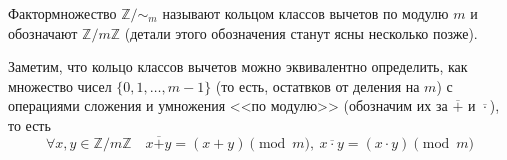 \documentclass[11pt]{article}
\begin{document}
\begin{definition}

	Фактормножество $\mathbb{Z}/\sim_{m}$ называют кольцом классов вычетов по модулю $m$ и обозначают $\mathbb{Z}/m\mathbb{Z}$ (детали этого обозначения станут ясны несколько позже).

\end{definition}
\begin{remark}

    Заметим, что кольцо классов вычетов можно эквивалентно определить, как множество чисел $\{ 0, 1, \ldots, m - 1\}$ (то есть, остатвков от деления на $m$) с операциями сложения и умножения <<по модулю>> (обозначим их за $\overline{+}$ и $\overline{\cdot}$), то есть
	\[ \forall x, y \in \mathbb{Z}/m\mathbb{Z} \quad x \overline{+} y = (x + y)\pmod{m}, \ x \overline{\cdot} y = (x \cdot y)\pmod{m} \]

\end{remark}
\end{document}
